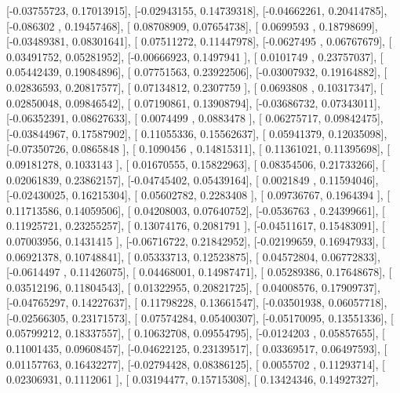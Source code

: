 \documentclass{article}
\begin{document}
       [-0.03755723,  0.17013915],
       [-0.02943155,  0.14739318],
       [-0.04662261,  0.20414785],
       [-0.086302  ,  0.19457468],
       [ 0.08708909,  0.07654738],
       [ 0.0699593 ,  0.18798699],
       [-0.03489381,  0.08301641],
       [ 0.07511272,  0.11447978],
       [-0.0627495 ,  0.06767679],
       [ 0.03491752,  0.05281952],
       [-0.00666923,  0.1497941 ],
       [ 0.0101749 ,  0.23757037],
       [ 0.05442439,  0.19084896],
       [ 0.07751563,  0.23922506],
       [-0.03007932,  0.19164882],
       [ 0.02836593,  0.20817577],
       [ 0.07134812,  0.2307759 ],
       [ 0.0693808 ,  0.10317347],
       [ 0.02850048,  0.09846542],
       [ 0.07190861,  0.13908794],
       [-0.03686732,  0.07343011],
       [-0.06352391,  0.08627633],
       [ 0.0074499 ,  0.0883478 ],
       [ 0.06275717,  0.09842475],
       [-0.03844967,  0.17587902],
       [ 0.11055336,  0.15562637],
       [ 0.05941379,  0.12035098],
       [-0.07350726,  0.0865848 ],
       [ 0.1090456 ,  0.14815311],
       [ 0.11361021,  0.11395698],
       [ 0.09181278,  0.1033143 ],
       [ 0.01670555,  0.15822963],
       [ 0.08354506,  0.21733266],
       [ 0.02061839,  0.23862157],
       [-0.04745402,  0.05439164],
       [ 0.0021849 ,  0.11594046],
       [-0.02430025,  0.16215304],
       [ 0.05602782,  0.2283408 ],
       [ 0.09736767,  0.1964394 ],
       [ 0.11713586,  0.14059506],
       [ 0.04208003,  0.07640752],
       [-0.0536763 ,  0.24399661],
       [ 0.11925721,  0.23255257],
       [ 0.13074176,  0.2081791 ],
       [-0.04511617,  0.15483091],
       [ 0.07003956,  0.1431415 ],
       [-0.06716722,  0.21842952],
       [-0.02199659,  0.16947933],
       [ 0.06921378,  0.10748841],
       [ 0.05333713,  0.12523875],
       [ 0.04572804,  0.06772833],
       [-0.0614497 ,  0.11426075],
       [ 0.04468001,  0.14987471],
       [ 0.05289386,  0.17648678],
       [ 0.03512196,  0.11804543],
       [ 0.01322955,  0.20821725],
       [ 0.04008576,  0.17909737],
       [-0.04765297,  0.14227637],
       [ 0.11798228,  0.13661547],
       [-0.03501938,  0.06057718],
       [-0.02566305,  0.23171573],
       [ 0.07574284,  0.05400307],
       [-0.05170095,  0.13551336],
       [ 0.05799212,  0.18337557],
       [ 0.10632708,  0.09554795],
       [-0.0124203 ,  0.05857655],
       [ 0.11001435,  0.09608457],
       [-0.04622125,  0.23139517],
       [ 0.03369517,  0.06497593],
       [ 0.01157763,  0.16432277],
       [-0.02794428,  0.08386125],
       [ 0.0055702 ,  0.11293714],
       [ 0.02306931,  0.1112061 ],
       [ 0.03194477,  0.15715308],
       [ 0.13424346,  0.14927327],
\end{document}
